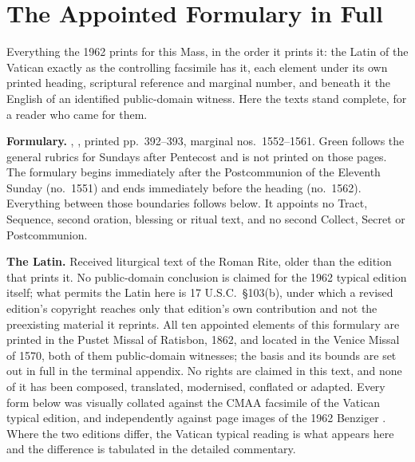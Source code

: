\sectionguard
\section*{The Appointed Formulary in Full}

Everything the 1962  prints for this Mass, in the order
it prints it: the Latin of the Vatican  exactly as the
controlling facsimile has it, each element under its own printed heading,
scriptural reference and marginal number, and beneath it the English of an
identified public-domain witness. Here the texts stand complete, for a
reader who came for them.

\textbf{Formulary.} , , printed pp.~392--393, marginal nos.\ 1552--1561. Green follows the
general rubrics for Sundays after Pentecost and is not printed on those pages.
The formulary begins immediately after the Postcommunion of the Eleventh
Sunday (no.\ 1551) and ends immediately before the heading  (no.\ 1562). Everything between those
boundaries follows below. It appoints no Tract, Sequence, second oration, blessing or
ritual text, and no second Collect, Secret or Postcommunion.

\textbf{The Latin.} Received liturgical text of the Roman Rite, older than the
edition that prints it. No public-domain conclusion is claimed for the 1962
typical edition itself; what permits the Latin here is 17 U.S.C.\ \S103(b),
under which a revised edition's copyright reaches only that edition's own
contribution and not the preexisting material it reprints. All ten appointed
elements of this formulary are printed in the Pustet Missal of Ratisbon, 1862,
and located in the Venice Missal of 1570, both of them public-domain
witnesses; the basis and its bounds are set out in full in the
terminal appendix. No rights are claimed in this text, and none of it has been
composed, translated, modernised, conflated or adapted. Every form below was
visually collated against the CMAA facsimile of the Vatican
typical edition, and independently against page images of the 1962 Benziger
. Where the two editions differ, the Vatican
typical reading is what appears here and the difference is tabulated in the
detailed commentary.

